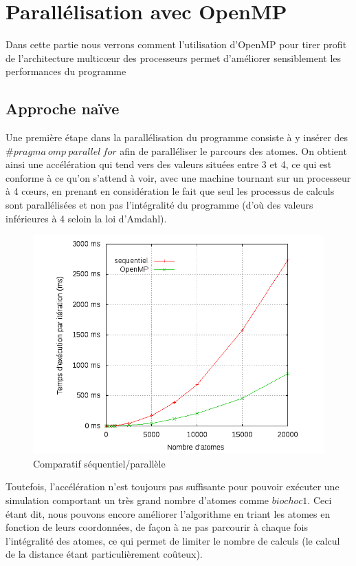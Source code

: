 \section{Parallélisation avec OpenMP}

Dans cette partie nous verrons comment l'utilisation d'OpenMP pour tirer profit de l'architecture multic\oe ur des processeurs permet d'améliorer sensiblement les performances du programme

\subsection{Approche naïve}

Une première étape dans la parallélisation du programme consiste à y insérer des \\
$\# pragma\ omp\ parallel\ for$ afin de paralléliser le parcours des atomes. On obtient ainsi une accélération qui tend vers des valeurs situées entre 3 et 4, ce qui est conforme à ce qu'on s'attend à voir, avec une machine tournant sur un processeur à 4 c\oe urs, en prenant en considération le fait que seul les processus de calculs sont parallélisées et non pas l'intégralité du programme (d'où des valeurs inférieures à 4 seloin la loi d'Amdahl).

\begin{figure}[!h]
    \centering
    \includegraphics[scale=0.7]{./img/seqomp.png}
    \caption{Comparatif séquentiel/parallèle}
\end{figure}

Toutefois, l'accélération n'est toujours pas suffisante pour pouvoir exécuter une simulation comportant un très grand nombre d'atomes comme $biochoc1$. 
Ceci étant dit, nous pouvons encore améliorer l'algorithme en triant les atomes en fonction de leurs coordonnées, de façon à ne pas parcourir à chaque fois l'intégralité des atomes, ce qui permet de limiter le nombre de calculs (le calcul de la distance étant particulièrement coûteux).  


